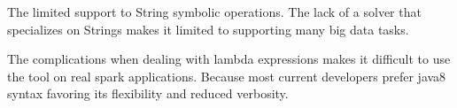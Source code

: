 

The limited support to String symbolic operations. The lack of a solver that specializes on Strings makes it limited to supporting many big data tasks.

The complications when dealing with lambda expressions makes it difficult to use the tool on real spark applications. Because most current developers prefer java8 syntax favoring its flexibility and reduced verbosity.